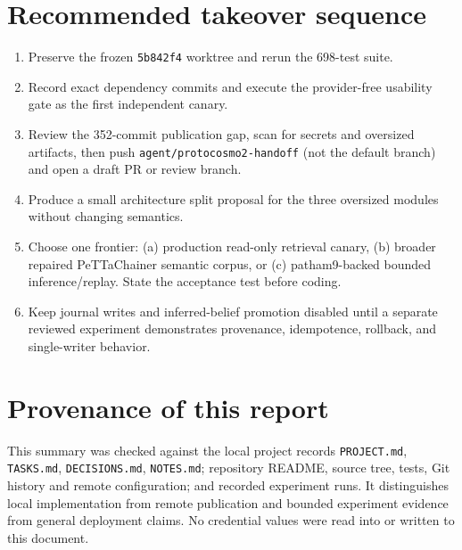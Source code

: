 \documentclass[11pt]{article}
\begin{document}
\section{Recommended takeover sequence}

\begin{enumerate}
\item Preserve the frozen \texttt{5b842f4} worktree and rerun the 698-test suite.
\item Record exact dependency commits and execute the provider-free usability
gate as the first independent canary.
\item Review the 352-commit publication gap, scan for secrets and oversized
artifacts, then push \texttt{agent/protocosmo2-handoff} (not the default branch)
and open a draft PR or review branch.
\item Produce a small architecture split proposal for the three oversized
modules without changing semantics.
\item Choose one frontier: (a) production read-only retrieval canary,
(b) broader repaired PeTTaChainer semantic corpus, or (c) patham9-backed
bounded inference/replay.  State the acceptance test before coding.
\item Keep journal writes and inferred-belief promotion disabled until a
separate reviewed experiment demonstrates provenance, idempotence, rollback,
and single-writer behavior.
\end{enumerate}

\section*{Provenance of this report}

This summary was checked against the local project records
\texttt{PROJECT.md}, \texttt{TASKS.md}, \texttt{DECISIONS.md},
\texttt{NOTES.md}; repository README, source tree, tests, Git history and
remote configuration; and recorded experiment runs.  It distinguishes local
implementation from remote publication and bounded experiment evidence from
general deployment claims.  No credential values were read into or written to
this document.
\end{document}
